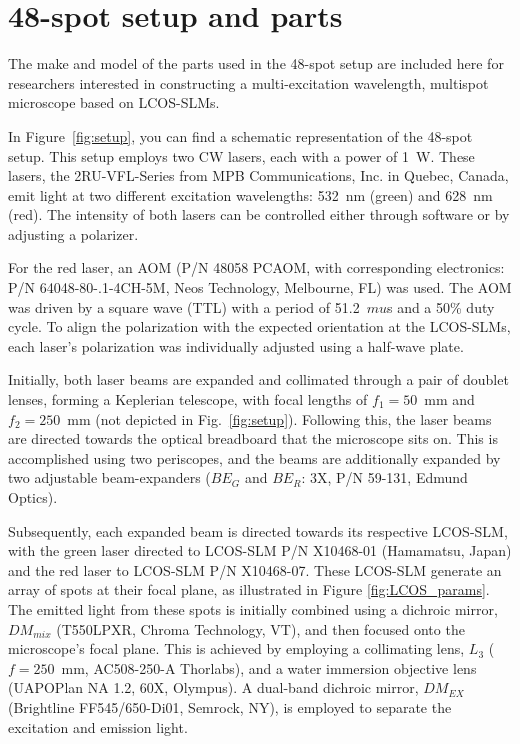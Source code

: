 \chapter{48-spot setup and parts}
\label{chpt:setup_appendix}

The make and model of the parts used in the 48-spot setup are included here for researchers interested in constructing a multi-excitation wavelength, multispot microscope based on \ac{LCOS-SLM}s. 

In Figure~\ref{fig:setup}, you can find a schematic representation of the 48-spot setup. 
This setup employs two \ac{CW} lasers, each with a power of 1~W. 
These lasers, the 2RU-VFL-Series from MPB Communications, Inc. in Quebec, Canada, emit light at two different excitation wavelengths: 532~nm (green) and 628~nm (red). 
The intensity of both lasers can be controlled either through software or by adjusting a polarizer.

For the red laser, an \ac{AOM} (P/N 48058 PCAOM, with corresponding electronics: P/N 64048-80-.1-4CH-5M, Neos Technology, Melbourne, FL) was used. 
The \ac{AOM} was driven by a square wave (\ac{TTL}) with a period of 51.2~$mu$s and a 50\% duty cycle. 
To align the polarization with the expected orientation at the \ac{LCOS-SLM}s, each laser's polarization was individually adjusted using a half-wave plate.

Initially, both laser beams are expanded and collimated through a pair of doublet lenses, forming a Keplerian telescope, with focal lengths of $f_1 = 50$~mm and $f_2 = 250$~mm (not depicted in Fig.~\ref{fig:setup}). 
Following this, the laser beams are directed towards the optical breadboard that the microscope sits on. 
This is accomplished using two periscopes, and the beams are additionally expanded by two adjustable beam-expanders ($BE_{G}$ and $BE_{R}$: 3X, P/N 59-131, Edmund Optics).

Subsequently, each expanded beam is directed towards its respective \ac{LCOS-SLM}, with the green laser directed to \ac{LCOS-SLM} P/N X10468-01 (Hamamatsu, Japan) and the red laser to \ac{LCOS-SLM} P/N X10468-07. 
These \ac{LCOS-SLM} generate an array of spots at their focal plane, as illustrated in Figure \ref{fig:LCOS_params}. 
The emitted light from these spots is initially combined using a dichroic mirror, $DM_{mix}$ (T550LPXR, Chroma Technology, VT), and then focused onto the microscope's focal plane. 
This is achieved by employing a collimating lens, $L_3$ ($f = 250$~mm, AC508-250-A Thorlabs), and a water immersion objective lens (UAPOPlan NA 1.2, 60X, Olympus). 
A dual-band dichroic mirror, $DM_{EX}$ (Brightline FF545/650-Di01, Semrock, NY), is employed to separate the excitation and emission light.

